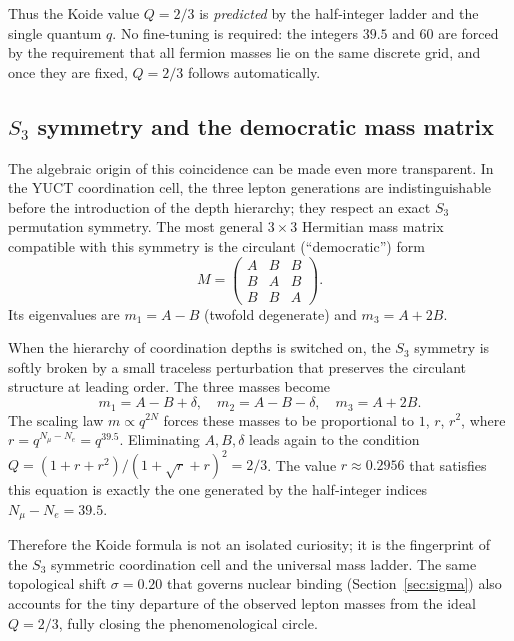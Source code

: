 \documentclass[11pt,a4paper]{article}
\begin{document}
Thus the Koide value $Q = 2/3$ is \emph{predicted} by the half‑integer
ladder and the single quantum $q$.  No fine‑tuning is required: the
integers $39.5$ and $60$ are forced by the requirement that all fermion
masses lie on the same discrete grid, and once they are fixed, $Q = 2/3$
follows automatically.

\subsection{$S_3$ symmetry and the democratic mass matrix}

The algebraic origin of this coincidence can be made even more transparent.
In the YUCT coordination cell, the three lepton generations are
indistinguishable before the introduction of the depth hierarchy; they
respect an exact $S_3$ permutation symmetry.  The most general $3\times3$
Hermitian mass matrix compatible with this symmetry is the circulant
(``democratic'') form
\begin{equation}
	M = \begin{pmatrix}
		A & B & B \\
		B & A & B \\
		B & B & A
	\end{pmatrix}.
	\label{eq:democratic}
\end{equation}
Its eigenvalues are $m_1 = A - B$ (twofold degenerate) and $m_3 = A + 2B$.

When the hierarchy of coordination depths is switched on, the $S_3$ symmetry
is softly broken by a small traceless perturbation that preserves the
circulant structure at leading order.  The three masses become
\begin{equation}
	m_1 = A - B + \delta,\quad
	m_2 = A - B - \delta,\quad
	m_3 = A + 2B.
\end{equation}
The scaling law $m \propto q^{2N}$ forces these masses to be proportional
to $1$, $r$, $r^2$, where $r = q^{N_\mu - N_e} = q^{39.5}$.  Eliminating
$A,B,\delta$ leads again to the condition $Q = (1+r+r^2)/(1+\sqrt{r}+r)^2
= 2/3$.  The value $r \approx 0.2956$ that satisfies this equation is
exactly the one generated by the half‑integer indices $N_\mu - N_e = 39.5$.

Therefore the Koide formula is not an isolated curiosity; it is the
fingerprint of the $S_3$ symmetric coordination cell and the universal
mass ladder.  The same topological shift $\sigma = 0.20$ that governs
nuclear binding (Section~\ref{sec:sigma}) also accounts for the tiny
departure of the observed lepton masses from the ideal $Q = 2/3$, fully
closing the phenomenological circle.
\end{document}
